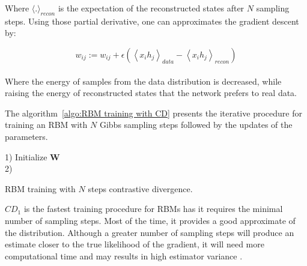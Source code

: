 \documentclass[a4paper,11pt]{report}
\begin{document}
		Where $\langle.\rangle_{recon}$ is the expectation of the reconstructed states after $N$ sampling steps. Using those partial derivative, one can approximates the gradient descent by:
		
		\begin{equation}
			w_{ij} := w_{ij} + \epsilon \left( \left\langle x_{i}h_{j} \right\rangle_{data} - \left\langle x_{i}h_{j} \right\rangle_{recon} \right)
			\label{eq:CD weight update}
		\end{equation}\\

		Where the energy of samples from the data distribution is decreased, while raising the energy of reconstructed states that the network prefers to real data.\\\par
		
		The algorithm~\ref{algo:RBM training with CD} presents the iterative procedure for training an RBM with $N$ Gibbs sampling steps followed by the updates of the parameters.\\
		
		\begin{center}
			\begin{algorithm}[H]
				1) Initialize $\mathbf{W}$\\
				2) 
				\caption{RBM training with $N$ steps contrastive divergence.}
				\label{algo:RBM training with CD}		
			\end{algorithm}
		\end{center}
		
		$CD_{1}$ is the fastest training procedure for RBMs has it requires the minimal number of sampling steps. Most of the time, it provides a good approximate of the distribution. Although a greater number of sampling steps will produce an estimate closer to the true likelihood of the gradient, it will need more computational time and may results in high estimator variance \cite{Hanlin_2013}.
		
\end{document}
